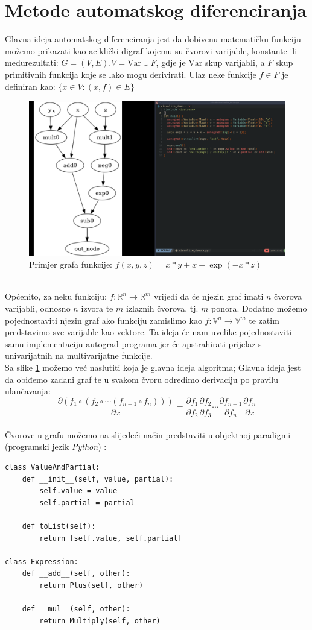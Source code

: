 \documentclass[zavrsnirad]{fer}
\begin{document}
\section{Metode automatskog diferenciranja}
Glavna ideja automatskog diferenciranja jest da dobivenu matematičku funkciju možemo prikazati kao aciklički digraf kojemu su čvorovi varijable, konstante ili međurezultati: $G = (V, E). V = \mathrm{Var} \cup F$, gdje je $\mathrm{Var}$ skup varijabli, a $F$ skup primitivnih funkcija koje se lako mogu derivirati. Ulaz neke funkcije $f \in F$ je definiran kao: $\{x \in V \colon (x, f) \in E\}$
\begin{figure}[h]
  \centering
  \includegraphics[width=0.7\linewidth]{../../pics/demo1.png}
  \caption{Primjer grafa funkcije: $f(x, y, z) = x * y + x - \exp(-x*z)$}
  \label{slk:graf_funkcije1}
\end{figure}
\\
Općenito, za neku funkciju: $f\colon \mathbb{R}^n \rightarrow \mathbb{R}^m$ vrijedi da će njezin graf imati $n$ čvorova varijabli, odnosno $n$ izvora te $m$ izlaznih čvorova, tj. $m$ ponora. Dodatno možemo pojednostaviti njezin graf ako funkciju zamislimo kao $f\colon \mathbb{V}^n \rightarrow \mathbb{V}^m$ te zatim predstavimo sve varijable kao vektore. Ta ideja će nam uvelike pojednostaviti samu implementaciju autograd programa jer će apstrahirati prijelaz s univarijatnih na multivarijatne funkcije.
\\
Sa slike \ref{slk:graf_funkcije1} možemo već naslutiti koja je glavna ideja algoritma; Glavna ideja jest da obiđemo zadani graf te u svakom čvoru odredimo derivaciju po pravilu ulančavanja:
\begin{equation}
  \frac{\partial (f_1 \circ (f_2 \circ \dotsb (f_{n-1} \circ f_n)))}{\partial x}
    = \frac{\partial f_1}{\partial f_2} \frac{\partial f_2}{\partial f_3}
      \dotsb
      \frac{\partial f_{n-1}}{\partial f_n} \frac{\partial f_n}{\partial x}
\end{equation}
\\
Čvorove u grafu možemo na slijedeći način predstaviti u objektnoj paradigmi (programski jezik \textit{Python}) \cite{wiki:autodiff}:
\lstset{language=python}
\begin{lstlisting}
class ValueAndPartial:
    def __init__(self, value, partial):
        self.value = value
        self.partial = partial

    def toList(self):
        return [self.value, self.partial]

class Expression:
    def __add__(self, other):
        return Plus(self, other)

    def __mul__(self, other):
        return Multiply(self, other)
\end{lstlisting}
\end{document}
